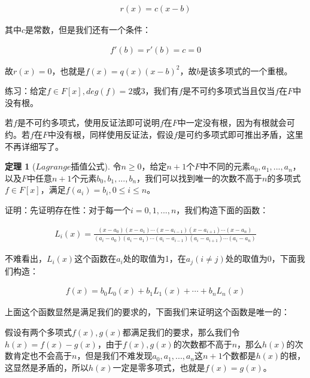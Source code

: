 \documentclass[12pt, a4paper, oneside]{ctexart}
\theoremstyle{definition}
\newtheorem*{theorem}{定理}
\begin{document}
\begin{align*}
r(x)=c(x-b)
\end{align*}

其中$c$是常数，但是我们还有一个条件：

\begin{align*}
f'(b)=r'(b)=c=0
\end{align*}

故$r(x)=0$，也就是$f(x)=q(x)(x-b)^2$，故$b$是该多项式的一个重根。

练习：给定$f\in F[x],deg(f)=2$或$3$，我们有$f$是不可约多项式当且仅当$f$在$F$中没有根。

若$f$是不可约多项式，使用反证法即可说明$f$在$F$中一定没有根，因为有根就会可约。若$f$在$F$中没有根，同样使用反证法，假设$f$是可约多项式即可推出矛盾，这里不再详细写了。

\begin{theorem}[$Lagrange$插值公式]
令$n\geqslant 0$，给定$n+1$个$F$中不同的元素$a_0,a_1,...,a_n$，以及$F$中任意$n+1$个元素$b_0,b_1,...,b_n$，我们可以找到唯一的次数不高于$n$的多项式$f\in F[x]$，满足$f(a_i)=b_i,0\leqslant i\leqslant n$。
\end{theorem}

证明：先证明存在性：对于每一个$i=0,1,...,n$，我们构造下面的函数：

\begin{align*}
L_i(x)=\frac{(x-a_0)(x-a_1)\cdots(x-a_{i-1})(x-a_{i+1})\cdots(x-a_n)}{(a_i-a_0)(a_i-a_1)\cdots(a_i-a_{i-1})(a_i-a_{i+1})\cdots(a_i-a_n)}
\end{align*}

不难看出，$L_i(x)$这个函数在$a_i$处的取值为1，在$a_j(i\neq j)$处的取值为0，下面我们构造：

\begin{align*}
f(x)=b_0L_0(x)+b_1L_1(x)+\cdots+b_nL_n(x)
\end{align*}

上面这个函数显然是满足我们的要求的，下面我们来证明这个函数是唯一的：

假设有两个多项式$f(x),g(x)$都满足我们的要求，那么我们令$h(x)=f(x)-g(x)$，由于$f(x),g(x)$的次数都不高于$n$，那么$h(x)$的次数肯定也不会高于$n$，但是我们不难发现$a_0,a_1,...,a_n$这$n+1$个数都是$h(x)$的根，这显然是矛盾的，所以$h(x)$一定是零多项式，也就是$f(x)=g(x)$。
\end{document}
